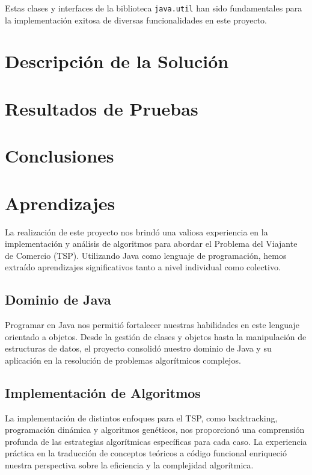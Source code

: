 \documentclass{article}
\begin{document}
	Estas clases y interfaces de la biblioteca \texttt{java.util} han sido fundamentales para la implementación exitosa de diversas funcionalidades en este proyecto.
	
	\section{Descripción de la Solución}
	
	\section{Resultados de Pruebas}
	
	\section{Conclusiones}
	
	\section{Aprendizajes}
	
	La realización de este proyecto nos brindó una valiosa experiencia en la implementación y análisis de algoritmos para abordar el Problema del Viajante de Comercio (TSP). Utilizando Java como lenguaje de programación, hemos extraído aprendizajes significativos tanto a nivel individual como colectivo.
	
	\subsection{Dominio de Java}
	
	Programar en Java nos permitió fortalecer nuestras habilidades en este lenguaje orientado a objetos. Desde la gestión de clases y objetos hasta la manipulación de estructuras de datos, el proyecto consolidó nuestro dominio de Java y su aplicación en la resolución de problemas algorítmicos complejos.
	
	\subsection{Implementación de Algoritmos}
	
	La implementación de distintos enfoques para el TSP, como backtracking, programación dinámica y algoritmos genéticos, nos proporcionó una comprensión profunda de las estrategias algorítmicas específicas para cada caso. La experiencia práctica en la traducción de conceptos teóricos a código funcional enriqueció nuestra perspectiva sobre la eficiencia y la complejidad algorítmica.
	
\end{document}
